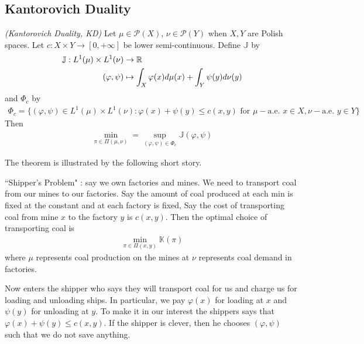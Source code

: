 \documentclass[12pt,a4paper]{article}
\begin{document}
\subsection{Kantorovich Duality}

 \emph{(Kantorovich Duality, KD)} Let $\mu \in \mathscr{P}(X)$, $\nu \in \mathscr{P}(Y)$ when $X, Y$ are Polish spaces. Let $c: X\times Y \rightarrow [0, +\infty]$ be lower semi-continuous. Define $\mathbb{J}$ by
\begin{align*}
\mathbb{J} : L^1(\mu) \times L^1(\nu) & \rightarrow \mathbb{R} \\
(\varphi, \psi) & \mapsto \int_X \varphi(x) d\mu(x) + \int_Y \psi(y)d\nu(y)
\end{align*}
and $\Phi_c$ by
\begin{align*}
\Phi_c = \{ (\varphi, \psi) \in L^1(\mu) \times L^1(\nu) : \varphi(x) + \psi(y) \leq c(x,y) \text{ for } \mu-\text{a.e. } x\in X, \nu-\text{a.e. } y\in Y \}
\end{align*}
Then
\begin{align*}
\min_{\pi \in \Pi(\mu, \nu)} = \sup_{(\varphi, \psi)\in \Phi_c} \mathbb{J}(\varphi, \psi)
\end{align*}
\s

The theorem is illustrated by the following short story.

``Shipper's Problem" : say we own factories and mines. We need to transport coal from our mines to our factories. Say the amount of coal produced at each min is fixed at the constant and at each factory is fixed, Say the cost of transporting coal from mine $x$ to the factory $y$ is $c(x,y)$. Then the optimal choice of transporting coal is
\begin{align*}
\min_{\pi \in \Pi(x,y)} \mathbb{K}(\pi)
\end{align*}
where $\mu$ represents coal production on the mines at $\nu$ represents coal demand in factories.

\quad Now enters the shipper who says they will transport coal for us and charge us for loading and unloading ships. In particular, we pay $\varphi(x)$ for loading at $x$ and $\psi(y)$  for unloading at $y$. To make it in our interest the shippers says that $\varphi(x) + \psi(y)\leq c(x,y)$. If the shipper is clever, then he chooses $(\varphi, \psi)$ such that we do not save anything.
\s
\end{document}
